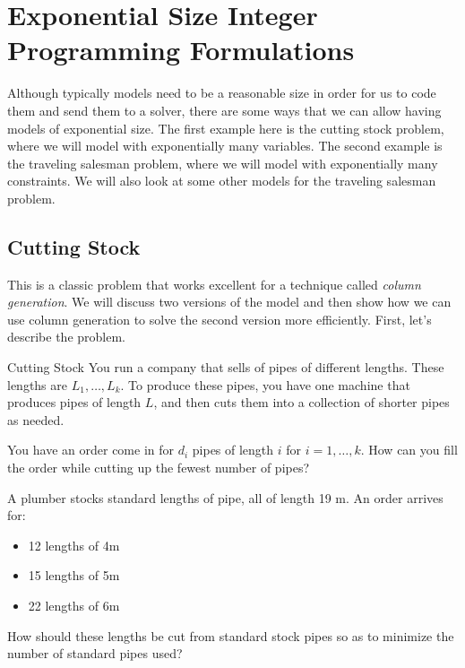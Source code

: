 \documentclass[../open-optimization/open-optimization.tex]{subfiles}
\begin{document}
\chapter{Exponential Size Integer Programming Formulations}
\label{sec:exponential-IP-forumulations}

Although typically models need to be a reasonable size in order for us to code them and send them to a solver, there are some ways that we can allow having models of exponential size.  The first example here is the cutting stock problem, where we will model with exponentially many variables.  The second example is the traveling salesman problem, where we will model with exponentially many constraints.  We will also look at some other models for the traveling salesman problem.  
\section{Cutting Stock}
This is a classic problem that works excellent for a technique called \emph{column generation}.
We will discuss two versions of the model and then show how we can use column generation to solve the second version more efficiently.  First, let's describe the problem.

\begin{general}{Cutting Stock}{}
You run a company that sells of pipes of different lengths.  These lengths are $L_1, \dots, L_k$.  To produce these pipes, you have one machine that produces pipes of length $L$, and then cuts them into a collection of shorter pipes as needed.  

You have an order come in for $d_i$ pipes of length $i$ for $i=1, \dots, k$.  How can you fill the order while cutting up the fewest number of pipes?
\end{general}
\begin{example}
A plumber stocks standard lengths of pipe, all of length 19 m. An order arrives for:
\begin{itemize}
\item  12 lengths of 4m
\item 15 lengths of 5m
\item 22 lengths of 6m
\end{itemize}
How should these lengths be cut from standard stock pipes so as to minimize
the number of standard pipes used?
\end{example}
\begin{center}
\end{center}
\end{document}
